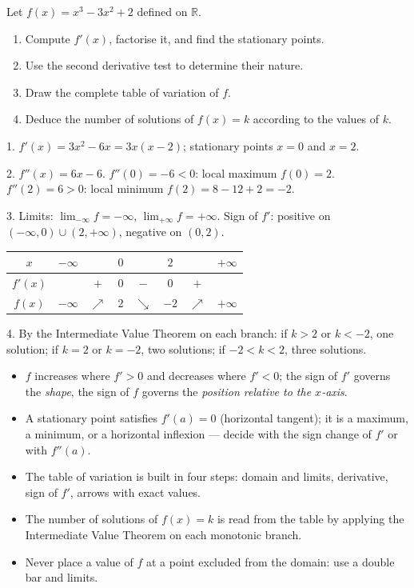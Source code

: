 \documentclass[11pt]{article}
\begin{document}
\begin{exercice}[Practice]
Let $f(x)=x^3-3x^2+2$ defined on $\mathbb{R}$.
\begin{enumerate}
\item Compute $f'(x)$, factorise it, and find the stationary points.
\item Use the second derivative test to determine their nature.
\item Draw the complete table of variation of $f$.
\item Deduce the number of solutions of $f(x)=k$ according to the values of $k$.
\end{enumerate}
\end{exercice}

\begin{corrige}[Exercise 1]
1. $f'(x)=3x^2-6x=3x(x-2)$; stationary points $x=0$ and $x=2$.

2. $f''(x)=6x-6$. $f''(0)=-6<0$: local maximum $f(0)=2$. $f''(2)=6>0$: local minimum $f(2)=8-12+2=-2$.

3. Limits: $\lim_{-\infty}f=-\infty$, $\lim_{+\infty}f=+\infty$. Sign of $f'$: positive on $(-\infty,0)\cup(2,+\infty)$, negative on $(0,2)$.
\begin{center}
\begin{tabular}{|c|ccccccc|}
\hline
$x$ & $-\infty$ & & $0$ & & $2$ & & $+\infty$ \\
\hline
$f'(x)$ & & $+$ & $0$ & $-$ & $0$ & $+$ & \\
\hline
$f(x)$ & $-\infty$ & $\nearrow$ & $2$ & $\searrow$ & $-2$ & $\nearrow$ & $+\infty$ \\
\hline
\end{tabular}
\end{center}

4. By the Intermediate Value Theorem on each branch: if $k>2$ or $k<-2$, one solution; if $k=2$ or $k=-2$, two solutions; if $-2<k<2$, three solutions.
\end{corrige}

\begin{aretenir}
\begin{itemize}
\item $f$ increases where $f'>0$ and decreases where $f'<0$; the sign of $f'$ governs the \emph{shape}, the sign of $f$ governs the \emph{position relative to the $x$-axis}.
\item A stationary point satisfies $f'(a)=0$ (horizontal tangent); it is a maximum, a minimum, or a horizontal inflexion — decide with the sign change of $f'$ or with $f''(a)$.
\item The table of variation is built in four steps: domain and limits, derivative, sign of $f'$, arrows with exact values.
\item The number of solutions of $f(x)=k$ is read from the table by applying the Intermediate Value Theorem on each monotonic branch.
\item Never place a value of $f$ at a point excluded from the domain: use a double bar and limits.
\end{itemize}
\end{aretenir}
\end{document}
